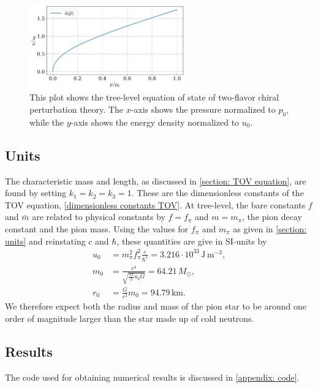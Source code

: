 \begin{figure}[h]
    \centering
    \includegraphics[width=0.6\textwidth]{../scripts/figurer/pion_tree_eos.pdf}
    \caption{
        This plot shows the tree-level equation of state of two-flavor chiral perturbation theory. The $x$-axis shows the pressure normalized to $p_0$, while the $y$-axis shows the energy density normalized to $u_0$.
        }
        \label{fig: quation of state pions tree level}
\end{figure}


\subsection{Units}

The characteristic mass and length, as discussed in \autoref{section: TOV equation}, are found by setting $k_1 = k_2 = k_3 = 1$.
These are the dimensionless constants of the TOV equation, \autoref{dimensionless constants TOV}.
At tree-level, the bare constants $f$ and $\bar m$ are related to physical constants by $f = f_\pi$ and $m = m_\pi$, the pion decay constant and the pion mass.
Using the values for $f_\pi$ and $m_\pi$ as given in \autoref{section: units} and reinstating $c$ and $\hbar$, these quantities are give in SI-units by
%
\begin{align}
    u_0 & =m_\pi^2 f_\pi^2 \frac{c}{\hbar^3}
    = 3.216\cdot 10^{33} \, \text{J}\,\text{m}^{-3}, \\
    m_0 & = \frac{c^4}{\sqrt{\frac{4 \pi}{ 3} u_0 G}} = 64.21\, M_\odot, \\
    r_0 & = \frac{G}{c^2} m_0 = 94.79 \, \text{km}.
\end{align}
%
We therefore expect both the radius and mass of the pion star to be around one order of magnitude larger than the star made up of cold neutrons.


\subsection{Results}

The code used for obtaining numerical results is discussed in \autoref{appendix: code}.

